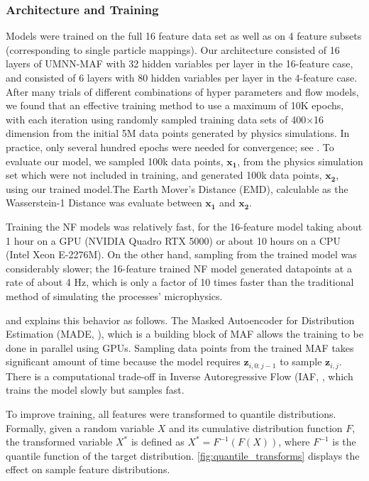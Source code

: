     \subsubsection*{Architecture and Training}
        Models were trained on the full 16 feature data set as well as on 4 feature subsets (corresponding to single particle mappings). Our architecture consisted of 16 layers of UMNN-MAF with 32 hidden variables per layer in the 16-feature case, and consisted of 6 layers with 80 hidden variables per layer in the 4-feature case. After many trials of different combinations of hyper parameters and flow models, we found that an effective training method to use a maximum of 10K epochs, with each iteration using randomly sampled training data sets of 400$\times$16 dimension from the initial 5M data points generated by physics simulations. In practice, only several hundred epochs were needed for convergence; see . To evaluate our model, we sampled 100k data points, $\mathbf{x_1}$, from the physics simulation set which were not included in training, and generated 100k data points, $\mathbf{x_2}$, using our trained model.The Earth Mover's Distance (EMD), calculable as the Wasserstein-1 Distance \parencite{Dobrushin1970PrescribingDistributions} was evaluate between $\mathbf{x_1}$ and $\mathbf{x_2}$. 
        
        Training the NF models was relatively fast, for the 16-feature model taking about 1 hour on a GPU (NVIDIA Quadro RTX 5000) or about 10 hours on a CPU (Intel Xeon E-2276M). On the other hand, sampling from the trained model was considerably slower; the 16-feature trained NF model generated datapoints at a rate of about 4 Hz, which is only a factor of 10 times faster than the traditional method of simulating the processes' microphysics. 
        
        \parencite{Wehenkel2019UnconstrainedNetworks} and \parencite{Papamakarios2017MaskedEstimation} explains this behavior as follows. The Masked Autoencoder for Distribution Estimation (MADE, \parencite{Germain2015MADE:Estimation}), which is a building block of MAF allows the training to be done in parallel using GPUs. Sampling data points from the trained MAF takes significant amount of time because the model requires $\mathbf{z}_{i,0:j-1}$ to sample $\mathbf{z}_{i,j}$. There is a computational trade-off in Inverse Autoregressive Flow (IAF, \parencite{Kingma2016ImprovingFlow}, which trains the model slowly but samples fast. 

    
        To improve training, all features were transformed to quantile distributions. Formally, given a random variable $X$ and its cumulative distribution function $F$, the transformed variable $X^*$ is defined as $X^* = F^{-1}(F(X))$, where $F^{-1}$ is the quantile function of the target distribution. \ref{fig:quantile_transforms} displays the effect on sample feature distributions. 

